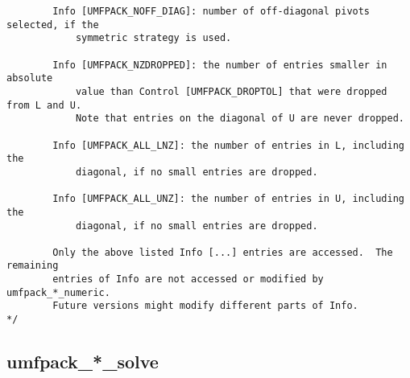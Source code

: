\documentclass[11pt]{article}
\begin{document}
{\begin{verbatim}
        Info [UMFPACK_NOFF_DIAG]: number of off-diagonal pivots selected, if the
            symmetric strategy is used.

        Info [UMFPACK_NZDROPPED]: the number of entries smaller in absolute
            value than Control [UMFPACK_DROPTOL] that were dropped from L and U.
            Note that entries on the diagonal of U are never dropped.

        Info [UMFPACK_ALL_LNZ]: the number of entries in L, including the
            diagonal, if no small entries are dropped.

        Info [UMFPACK_ALL_UNZ]: the number of entries in U, including the
            diagonal, if no small entries are dropped.

        Only the above listed Info [...] entries are accessed.  The remaining
        entries of Info are not accessed or modified by umfpack_*_numeric.
        Future versions might modify different parts of Info.
*/

\end{verbatim}
}

\newpage
\subsection{umfpack\_*\_solve}
\end{document}
